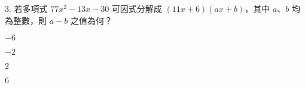 \documentclass[12pt]{article}
\begin{document}
\begin{problem}
  \item[3.] 若多項式 $77x^2 - 13x - 30$ 可因式分解成 $(11x + 6)(ax + b)$，其中 $a$、$b$ 均為整數，則 $a - b$ 之值為何？
  \begin{choices}
    \item $-6$
    \item $-2$
    \item $2$
    \item $6$
  \end{choices}
\end{problem}
\end{document}
